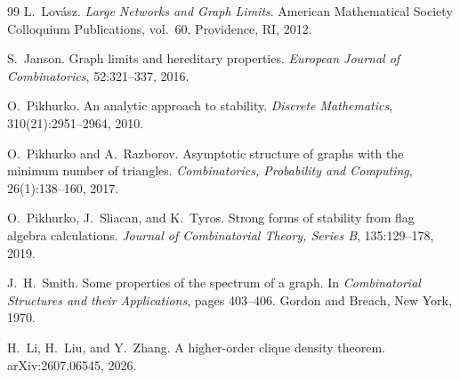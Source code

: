 \documentclass[11pt]{article}
\theoremstyle{definition}
\begin{document}
\begin{thebibliography}{99}
L.~Lov\'asz.
\newblock \emph{Large Networks and Graph Limits}.
\newblock American Mathematical Society Colloquium Publications, vol.~60,
Providence, RI, 2012.

S.~Janson.
\newblock Graph limits and hereditary properties.
\newblock \emph{European Journal of Combinatorics}, 52:321--337, 2016.

O.~Pikhurko.
\newblock An analytic approach to stability.
\newblock \emph{Discrete Mathematics}, 310(21):2951--2964, 2010.

O.~Pikhurko and A.~Razborov.
\newblock Asymptotic structure of graphs with the minimum number of triangles.
\newblock \emph{Combinatorics, Probability and Computing}, 26(1):138--160, 2017.

O.~Pikhurko, J.~Sliacan, and K.~Tyros.
\newblock Strong forms of stability from flag algebra calculations.
\newblock \emph{Journal of Combinatorial Theory, Series B}, 135:129--178, 2019.

J.~H.~Smith.
\newblock Some properties of the spectrum of a graph.
\newblock In \emph{Combinatorial Structures and their Applications}, pages 403--406.
\newblock Gordon and Breach, New York, 1970.

H.~Li, H.~Liu, and Y.~Zhang.
\newblock A higher-order clique density theorem.
\newblock arXiv:2607.06545, 2026.

\end{thebibliography}
\end{document}

